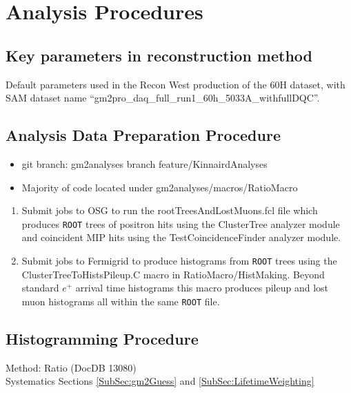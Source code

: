 \graphicspath{ {Figures/CBO/Frequency/} {Figures/VW/} }

\chapter{Analysis Procedures}
\label{Ch:Procedures}


\section{Key parameters in reconstruction method}

	Default parameters used in the Recon West production of the 60H dataset, with SAM dataset name ``gm2pro\_daq\_full\_run1\_60h\_5033A\_withfullDQC''.

\section{Analysis Data Preparation Procedure}

	\begin{itemize}
		\item{git branch: gm2analyses branch feature/KinnairdAnalyses}
		\item{Majority of code located under gm2analyses/macros/RatioMacro}
	\end{itemize}

	\begin{enumerate}
		\item{Submit jobs to OSG to run the rootTreesAndLostMuons.fcl file which produces \texttt{ROOT} trees of positron hits using the ClusterTree analyzer module and coincident MIP hits using the TestCoincidenceFinder analyzer module.}
		\item{Submit jobs to Fermigrid to produce histograms from \texttt{ROOT} trees using the ClusterTreeToHistsPileup.C macro in RatioMacro/HistMaking. Beyond standard $e^{+}$ arrival time histograms this macro produces pileup and lost muon histograms all within the same \texttt{ROOT} file.}
	\end{enumerate}


\section{Histogramming Procedure}

	Method: Ratio (DocDB 13080) \\
	\noindent Systematics Sections \ref{SubSec:gm2Guess} and \ref{SubSec:LifetimeWeighting}

